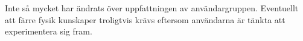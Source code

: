 Inte så mycket har ändrats över uppfattningen av användargruppen.
Eventuellt att färre fysik kunskaper troligtvis krävs eftersom användarna
är tänkta att experimentera sig fram.

